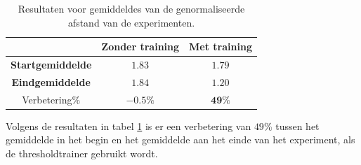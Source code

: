 \documentclass{article}
\begin{document}
\begin{table}[H]
	\begin{tabular}{|c|c|c|}
		\hline  & \textbf{Zonder training} & \textbf{Met training} \\ 
		\hline \textbf{Startgemiddelde} & $1.83$ & $1.79$ \\ 
		\hline \textbf{Eindgemiddelde} & $1.84$ & $1.20$ \\ 
		\hline Verbetering\% & $\mathbf{-0.5}\%$ & $\mathbf{49}\%$\\
		\hline
	\end{tabular} 
	\caption{Resultaten voor gemiddeldes van de genormaliseerde afstand van de experimenten.}
	\label{tbl:resgemiddeldesdist}
\end{table}
Volgens de resultaten in tabel \ref{tbl:resgemiddeldesdist} is er een verbetering van $49$\% tussen het gemiddelde in het begin en het gemiddelde aan het einde van het experiment, als de thresholdtrainer gebruikt wordt.
\end{document}
